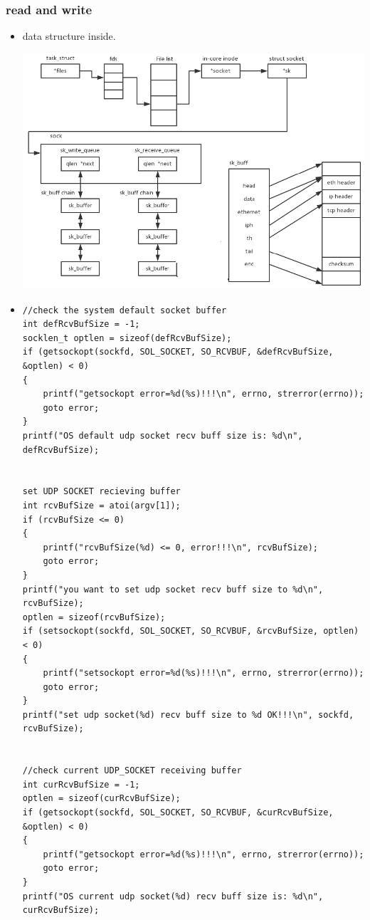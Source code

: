 \documentclass[a4paper,11pt,twoside]{book}
\begin{document}
\subsubsection{read and write}
\begin{itemize}
		\item data structure inside.
	\begin{center}
		\includegraphics[width=0.85\linewidth]{pics/socket_inside.png}
	\end{center}
	
	
	\item 
\begin{lstlisting}
//check the system default socket buffer
int defRcvBufSize = -1;
socklen_t optlen = sizeof(defRcvBufSize);
if (getsockopt(sockfd, SOL_SOCKET, SO_RCVBUF, &defRcvBufSize, &optlen) < 0)
{
	printf("getsockopt error=%d(%s)!!!\n", errno, strerror(errno));
	goto error;
}
printf("OS default udp socket recv buff size is: %d\n", defRcvBufSize);


set UDP SOCKET recieving buffer
int rcvBufSize = atoi(argv[1]);
if (rcvBufSize <= 0)
{
	printf("rcvBufSize(%d) <= 0, error!!!\n", rcvBufSize);
	goto error;
}
printf("you want to set udp socket recv buff size to %d\n", rcvBufSize);
optlen = sizeof(rcvBufSize);
if (setsockopt(sockfd, SOL_SOCKET, SO_RCVBUF, &rcvBufSize, optlen) < 0)
{
	printf("setsockopt error=%d(%s)!!!\n", errno, strerror(errno));
	goto error;
}
printf("set udp socket(%d) recv buff size to %d OK!!!\n", sockfd, rcvBufSize);


//check current UDP_SOCKET receiving buffer
int curRcvBufSize = -1;
optlen = sizeof(curRcvBufSize);
if (getsockopt(sockfd, SOL_SOCKET, SO_RCVBUF, &curRcvBufSize, &optlen) < 0)
{
	printf("getsockopt error=%d(%s)!!!\n", errno, strerror(errno));
	goto error;
}
printf("OS current udp socket(%d) recv buff size is: %d\n", curRcvBufSize);
\end{lstlisting}
	

\end{itemize}
\end{document}
